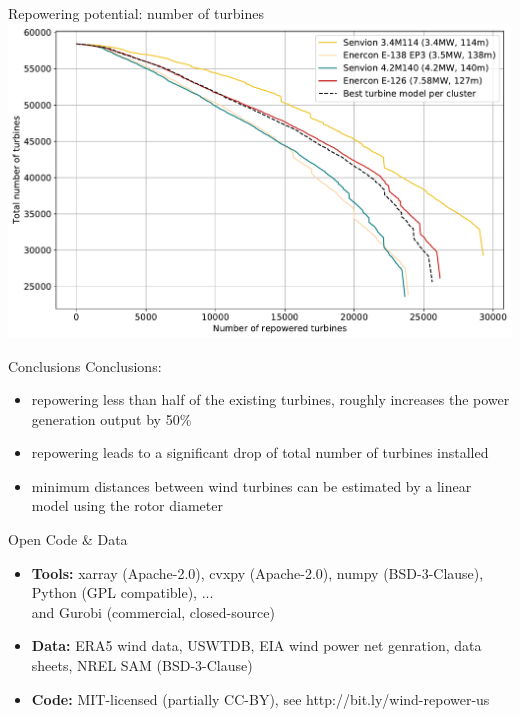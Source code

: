 \documentclass[color=usenames,dvipsnames]{beamer}
\begin{document}
    \begin{frame}{Repowering potential: number of turbines}
        \includegraphics[width=\textwidth]{../../figures/repower_potential-direction-dependent_num_turbines.pdf}
    \end{frame}

    \begin{frame}{Conclusions}
        Conclusions:\\
        \begin{itemize}
            \item repowering less than half of the existing turbines, roughly increases the
                power generation output by 50\%\pause
            \item repowering leads to a significant drop of total number of
                turbines installed\pause
            \item minimum distances between wind turbines can be estimated by a
                linear model using the rotor diameter\pause
        \end{itemize}
    \end{frame}

    \begin{frame}{Open Code \& Data}
        \begin{itemize}
            \item \textbf{Tools:} xarray (Apache-2.0), cvxpy (Apache-2.0), numpy (BSD-3-Clause),
                Python (GPL compatible), ...\pause\\
                and Gurobi (commercial, closed-source)\pause
            \item \textbf{Data:} ERA5 wind data, USWTDB, EIA wind power net genration,
                data sheets, NREL SAM (BSD-3-Clause)\pause
            \item \textbf{Code:} MIT-licensed (partially CC-BY), see http://bit.ly/wind-repower-us
        \end{itemize}
    \end{frame}
\end{document}
